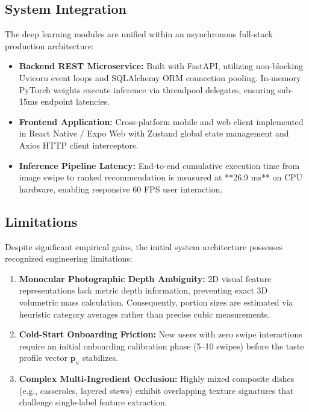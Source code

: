 \documentclass[10pt,journal,compsoc]{IEEEtran}
\begin{document}
\subsection{System Integration}
The deep learning modules are unified within an asynchronous full-stack production architecture:
\begin{itemize}
    \item \textbf{Backend REST Microservice:} Built with FastAPI, utilizing non-blocking Uvicorn event loops and SQLAlchemy ORM connection pooling. In-memory PyTorch weights execute inference via threadpool delegates, ensuring sub-15ms endpoint latencies.
    \item \textbf{Frontend Application:} Cross-platform mobile and web client implemented in React Native / Expo Web with Zustand global state management and Axios HTTP client interceptors.
    \item \textbf{Inference Pipeline Latency:} End-to-end cumulative execution time from image swipe to ranked recommendation is measured at **26.9 ms** on CPU hardware, enabling responsive 60 FPS user interaction.
\end{itemize}

\subsection{Limitations}
Despite significant empirical gains, the initial system architecture possesses recognized engineering limitations:
\begin{enumerate}
    \item \textbf{Monocular Photographic Depth Ambiguity:} 2D visual feature representations lack metric depth information, preventing exact 3D volumetric mass calculation. Consequently, portion sizes are estimated via heuristic category averages rather than precise cubic measurements.
    \item \textbf{Cold-Start Onboarding Friction:} New users with zero swipe interactions require an initial onboarding calibration phase (5–10 swipes) before the taste profile vector $\mathbf{p}_u$ stabilizes.
    \item \textbf{Complex Multi-Ingredient Occlusion:} Highly mixed composite dishes (e.g., casseroles, layered stews) exhibit overlapping texture signatures that challenge single-label feature extraction.
\end{enumerate}

\end{document}
